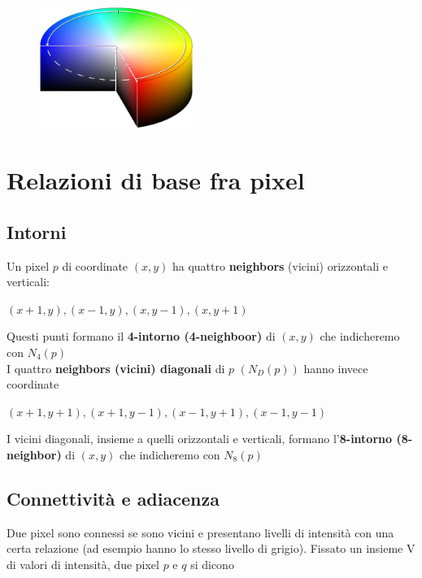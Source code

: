 \begin{figure}[H]
    \centering
    \includegraphics[width=5cm, keepaspectratio]{capitoli/immagini/imgs/cilindro_hsv.jpg}
\end{figure}


\section{Relazioni di base fra pixel}

\subsection{Intorni}

Un pixel $p$ di coordinate $(x,y)$ ha quattro \textbf{neighbors} (vicini)
orizzontali e verticali:

\begin{center}
    $(x+1, y), (x-1, y), (x, y-1), (x, y+1)$
\end{center}

Questi punti formano il \textbf{4-intorno (4-neighboor)} di $(x,y)$ che
indicheremo con $N_4(p)$ \\I quattro \textbf{neighbors (vicini) diagonali} di
$p$ $(N_D(p))$ hanno invece coordinate

\begin{center}
    $(x+1, y+1), (x+1,y-1), (x-1, y+1), (x-1, y-1)$
\end{center}

I vicini diagonali, insieme a quelli orizzontali e verticali, formano
l'\textbf{8-intorno (8-neighbor)} di $(x,y)$  che indicheremo con $N_8(p)$

\subsection{Connettività e adiacenza}

Due pixel sono connessi se sono vicini e presentano livelli di intensità con una
certa relazione (ad esempio hanno lo stesso livello di grigio). Fissato un
insieme V di valori di intensità, due pixel $p$ e $q$ si dicono

